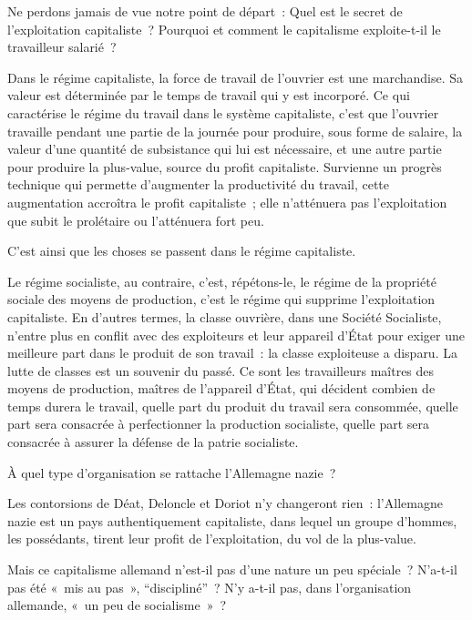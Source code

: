 \documentclass[french,twoside]{book} %
\newcommand\chaptercont{} %
\begin{document}
\chaptercont
\noindent Ne perdons jamais de vue notre point de départ : Quel est le secret de l’exploitation capitaliste ? Pourquoi et comment le capitalisme exploite-t-il le travailleur salarié ?\par
Dans le régime capitaliste, la force de travail de l’ouvrier est une marchandise. Sa valeur est déterminée par le temps de travail qui y est incorporé. Ce qui caractérise le régime du travail dans le système capitaliste, c’est que l’ouvrier travaille pendant une partie de la journée pour produire, sous forme de salaire, la valeur d’une quantité de subsistance qui lui est nécessaire, et une autre partie pour produire la plus-value, source du profit capitaliste. Survienne un progrès technique qui permette d’augmenter la productivité du travail, cette augmentation accroîtra le profit capitaliste ; elle n’atténuera pas l’exploitation que subit le prolétaire ou l’atténuera fort peu.\par
C’est ainsi que les choses se passent dans le régime capitaliste.\par
Le régime socialiste, au contraire, c’est, répétons-le, le régime de la propriété sociale des moyens de production, c’est le régime qui supprime l’exploitation capitaliste. En d’autres termes, la classe ouvrière, dans une Société Socialiste, n’entre plus en conflit avec des exploiteurs et leur appareil d’État pour exiger une meilleure part dans le produit de son travail : la classe exploiteuse a disparu. La lutte de classes est un souvenir du passé. Ce sont les travailleurs maîtres des moyens de production, maîtres de l’appareil d’État, qui décident combien de temps durera le travail, quelle part du produit du travail sera consommée, quelle part sera consacrée à perfectionner la production socialiste, quelle part sera consacrée à assurer la défense de la patrie socialiste.\par
À quel type d’organisation se rattache l’Allemagne nazie ?\par
Les contorsions de Déat, Deloncle et Doriot n’y changeront rien : l’Allemagne nazie est un pays authentiquement capitaliste, dans lequel un groupe d’hommes, les possédants, tirent leur profit de l’exploitation, du vol de la plus-value.\par
Mais ce capitalisme allemand n’est-il pas d’une nature un peu spéciale ? N’a-t-il pas été « mis au pas », “discipliné” ? N’y a-t-il pas, dans l’organisation allemande, « un peu de socialisme » ?\par
\end{document}
